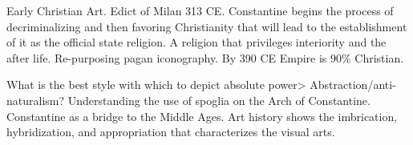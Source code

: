 \documentclass[10pt]{armath}
\begin{document}
\begin{multicols}{2}
Early Christian Art. Edict of Milan 313 CE. Constantine begins the process of
decriminalizing and then favoring Christianity that will lead to the
establishment of it as the official state religion. A religion that privileges
interiority and the after life. Re-purposing pagan iconography. By 390 CE
Empire is 90\% Christian.

What is the best style with which to depict absolute power>
Abstraction/anti-naturalism? Understanding the use of spoglia on the Arch of
Constantine. Constantine as a bridge to the Middle Ages. Art history shows the
imbrication, hybridization, and appropriation that characterizes the visual
arts.
\end{multicols}
\end{document}
